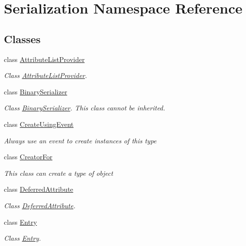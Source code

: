 \hypertarget{namespace_serialization}{}\section{Serialization Namespace Reference}
\label{namespace_serialization}
\subsection*{Classes}
\begin{DoxyCompactItemize}
\item 
class \hyperlink{class_serialization_1_1_attribute_list_provider}{Attribute\+List\+Provider}
\begin{DoxyCompactList}\small\item\em Class \hyperlink{class_serialization_1_1_attribute_list_provider}{Attribute\+List\+Provider}. \end{DoxyCompactList}\item 
class \hyperlink{class_serialization_1_1_binary_serializer}{Binary\+Serializer}
\begin{DoxyCompactList}\small\item\em Class \hyperlink{class_serialization_1_1_binary_serializer}{Binary\+Serializer}. This class cannot be inherited. \end{DoxyCompactList}\item 
class \hyperlink{class_serialization_1_1_create_using_event}{Create\+Using\+Event}
\begin{DoxyCompactList}\small\item\em Always use an event to create instances of this type \end{DoxyCompactList}\item 
class \hyperlink{class_serialization_1_1_creator_for}{Creator\+For}
\begin{DoxyCompactList}\small\item\em This class can create a type of object \end{DoxyCompactList}\item 
class \hyperlink{class_serialization_1_1_deferred_attribute}{Deferred\+Attribute}
\begin{DoxyCompactList}\small\item\em Class \hyperlink{class_serialization_1_1_deferred_attribute}{Deferred\+Attribute}. \end{DoxyCompactList}\item 
class \hyperlink{class_serialization_1_1_entry}{Entry}
\begin{DoxyCompactList}\small\item\em Class \hyperlink{class_serialization_1_1_entry}{Entry}. \end{DoxyCompactList}\item 

\end{DoxyCompactItemize}
